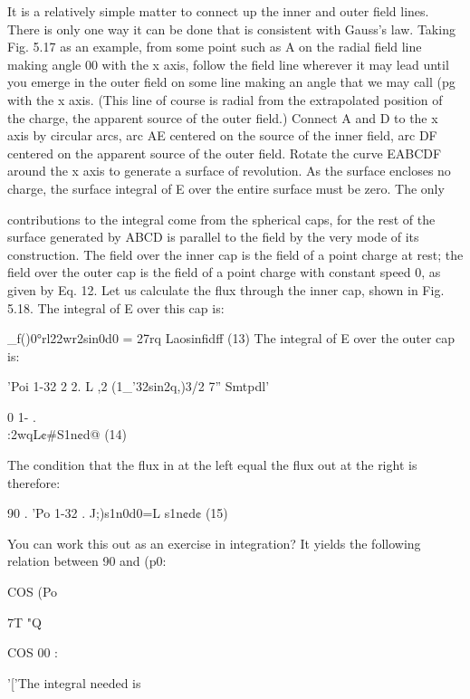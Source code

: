 It is a relatively simple matter to connect up the inner and outer
field lines. There is only one way it can be done that is consistent
with Gauss's law. Taking Fig. 5.17 as an example, from some point
such as A on the radial field line making angle 00 with the x axis,
follow the field line wherever it may lead until you emerge in the
outer field on some line making an angle that we may call (pg with
the x axis. (This line of course is radial from the extrapolated position
of the charge, the apparent source of the outer field.) Connect
A and D to the x axis by circular arcs, arc AE centered on the source
of the inner field, arc DF centered on the apparent source of the
outer field. Rotate the curve EABCDF around the x axis to generate
a surface of revolution. As the surface encloses no charge, the surface
integral of E over the entire surface must be zero. The only

 

contributions to the integral come from the spherical caps, for the
rest of the surface generated by ABCD is parallel to the field by the
very mode of its construction. The field over the inner cap is the
field of a point charge at rest; the field over the outer cap is the field
of a point charge with constant speed 0, as given by Eq. 12. Let us
calculate the flux through the inner cap, shown in Fig. 5.18. The
integral of E over this cap is:

\begin{equation}
\end{equation}
_f()0°rl22wr2sin0d0 = 27rq Laosinfidff (13)
The integral of E over the outer cap is:

'Poi 1-32 2 2.
L ,2 (1_'32sin2q,)3/2 7'' Smtpdl'

0 1- .
\begin{equation}
\end{equation}
:2wqL¢#S1n¢d@ (14)

The condition that the flux in at the left equal the flux out at the
right is therefore:

\begin{equation}
\end{equation}
90 . 'Po 1-32 .
J;)s1n0d0=L  s1n¢d¢ (15)

You can work this out as an exercise in integration? It yields the
following relation between 90 and (p0:

COS (Po

7T  "Q

COS 00 :

'['The integral needed is

